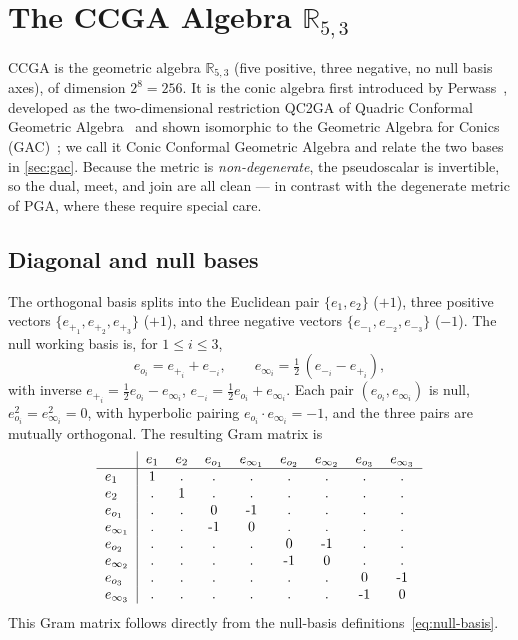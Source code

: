 \documentclass{birkjour}
\theoremstyle{definition}
\theoremstyle{remark}
\begin{document}
\section{The CCGA Algebra \texorpdfstring{$\mathbb{R}_{5,3}$}{R(5,3)}}
\label{sec:algebra}
CCGA is the geometric algebra $\mathbb{R}_{5,3}$ (five positive, three negative,
no null basis axes), of dimension $2^8 = 256$. It is the conic algebra first
introduced by Perwass~\cite{perwass_geometric_2009}, developed as the
two-dimensional restriction QC2GA of Quadric Conformal Geometric
Algebra~\cite{breuils_three-dimensional_2019} and shown isomorphic to the
Geometric Algebra for Conics (GAC)~\cite{hrdina_geometric_2018}; we call it Conic
Conformal Geometric Algebra and relate the two bases in
\cref{sec:gac}. Because the metric is \emph{non-degenerate}, the pseudoscalar is
invertible, so the dual, meet, and join are all clean --- in contrast with the
degenerate metric of PGA, where these require special care.

\subsection{Diagonal and null bases}
The orthogonal basis splits into the Euclidean pair $\{e_1,e_2\}$ ($+1$), three
positive vectors $\{e_{+_1},e_{+_2},e_{+_3}\}$ ($+1$), and three negative vectors
$\{e_{-_1},e_{-_2},e_{-_3}\}$ ($-1$). The null working basis is, for $1\le i\le 3$,
\begin{equation}\label{eq:null-basis}
  e_{o_i} = e_{+_i}+e_{-_i}, \qquad
  e_{\infty_i} = \tfrac12\,(e_{-_i}-e_{+_i}),
\end{equation}
with inverse $e_{+_i} = \tfrac12 e_{o_i} - e_{\infty_i}$,
$e_{-_i} = \tfrac12 e_{o_i} + e_{\infty_i}$. Each pair $(e_{o_i}, e_{\infty_i})$ is
null, $e_{o_i}^2 = e_{\infty_i}^2 = 0$, with hyperbolic pairing
$e_{o_i}\!\cdot e_{\infty_i} = -1$, and the three pairs are mutually orthogonal.
The resulting Gram matrix is
\begin{equation}
  \begin{tabular}{l|cccccccc}
    & $e_1$ & $e_2$ & $e_{o_1}$ & $e_{\infty_1}$ & $e_{o_2}$ & $e_{\infty_2}$ & $e_{o_3}$ & $e_{\infty_3}$ \\
    \hline
    $e_1$          & 1 & . & . & . & . & . & . & . \\
    $e_2$          & . & 1 & . & . & . & . & . & . \\
    $e_{o_1}$      & . & . & 0 & -1& . & . & . & . \\
    $e_{\infty_1}$ & . & . & -1& 0 & . & . & . & . \\
    $e_{o_2}$      & . & . & . & . & 0 & -1& . & . \\
    $e_{\infty_2}$ & . & . & . & . & -1& 0 & . & . \\
    $e_{o_3}$      & . & . & . & . & . & . & 0 & -1\\
    $e_{\infty_3}$ & . & . & . & . & . & . & -1& 0
  \end{tabular}
  \label{eq:gram}
\end{equation}
This Gram matrix follows directly from the null-basis
definitions~\eqref{eq:null-basis}.
\end{document}
